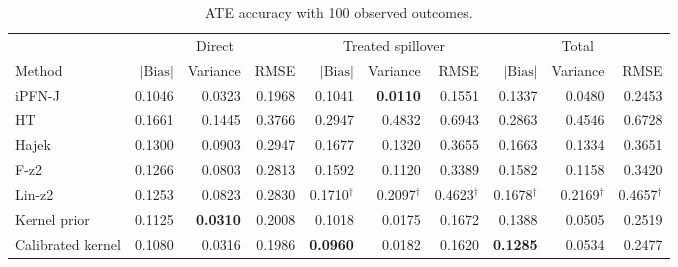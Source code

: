 \begin{table}[tb]
\centering
\caption{ATE accuracy with 100 observed outcomes.}
\begingroup\footnotesize
\setlength{\tabcolsep}{3pt}
\begin{tabular*}{\linewidth}{@{\extracolsep{\fill}}l*{9}{r}@{}}
\toprule
&\multicolumn{3}{c}{Direct}&\multicolumn{3}{c}{Treated spillover}&\multicolumn{3}{c}{Total}\\
\cmidrule(lr){2-4}\cmidrule(lr){5-7}\cmidrule(lr){8-10}
Method&$|\mathrm{Bias}|$&Variance&RMSE&$|\mathrm{Bias}|$&Variance&RMSE&$|\mathrm{Bias}|$&Variance&RMSE\\
\midrule
iPFN-J & \cellcolor{blue!17}0.1046 & \cellcolor{blue!7}0.0323 & \cellcolor{blue!17}0.1968 & \cellcolor{blue!7}0.1041 & \cellcolor{blue!24}\textbf{0.0110} & \cellcolor{blue!17}0.1551 & \cellcolor{blue!11}0.1337 & \cellcolor{blue!17}0.0480 & \cellcolor{blue!17}0.2453 \\
HT & \cellcolor{blue!1}0.1661 & \cellcolor{blue!1}0.1445 & \cellcolor{blue!1}0.3766 & \cellcolor{blue!1}0.2947 & \cellcolor{blue!1}0.4832 & \cellcolor{blue!1}0.6943 & \cellcolor{blue!1}0.2863 & \cellcolor{blue!1}0.4546 & \cellcolor{blue!1}0.6728 \\
Hajek & \cellcolor{blue!1}0.1300 & \cellcolor{blue!1}0.0903 & \cellcolor{blue!1}0.2947 & \cellcolor{blue!1}0.1677 & \cellcolor{blue!1}0.1320 & \cellcolor{blue!1}0.3655 & \cellcolor{blue!1}0.1663 & \cellcolor{blue!1}0.1334 & \cellcolor{blue!1}0.3651 \\
F-z2 & \cellcolor{blue!1}0.1266 & \cellcolor{blue!2}0.0803 & \cellcolor{blue!2}0.2813 & \cellcolor{blue!2}0.1592 & \cellcolor{blue!2}0.1120 & \cellcolor{blue!2}0.3389 & \cellcolor{blue!2}0.1582 & \cellcolor{blue!2}0.1158 & \cellcolor{blue!2}0.3420 \\
Lin-z2 & \cellcolor{blue!2}0.1253 & \cellcolor{blue!1}0.0823 & \cellcolor{blue!1}0.2830 & 0.1710$^{\dagger}$ & 0.2097$^{\dagger}$ & 0.4623$^{\dagger}$ & 0.1678$^{\dagger}$ & 0.2169$^{\dagger}$ & 0.4657$^{\dagger}$ \\
Kernel prior & \cellcolor{blue!4}0.1125 & \cellcolor{blue!24}\textbf{0.0310} & \cellcolor{blue!4}0.2008 & \cellcolor{blue!11}0.1018 & \cellcolor{blue!7}0.0175 & \cellcolor{blue!4}0.1672 & \cellcolor{blue!4}0.1388 & \cellcolor{blue!7}0.0505 & \cellcolor{blue!4}0.2519 \\
Calibrated kernel & \cellcolor{blue!7}0.1080 & \cellcolor{blue!17}0.0316 & \cellcolor{blue!7}0.1986 & \cellcolor{blue!24}\textbf{0.0960} & \cellcolor{blue!4}0.0182 & \cellcolor{blue!7}0.1620 & \cellcolor{blue!24}\textbf{0.1285} & \cellcolor{blue!4}0.0534 & \cellcolor{blue!7}0.2477 \\

\end{tabular*}
\end{table}
